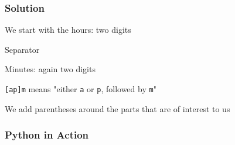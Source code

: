 \begin{frame}
  \frametitle{Solution}
  \begin{center} \ttfamily
  \end{center}
  \vskip5mm
  \begin{overprint}
    \begin{center}
      We start with the hours: two digits
    \end{center}

    \begin{center}
      Separator
    \end{center}

    \begin{center}
      Minutes: again two digits
    \end{center}

    \begin{center}
      \texttt{[ap]m} means "either \texttt{a} or \texttt{p}, followed by \texttt{m}"
    \end{center}

    \begin{center}
      We add parentheses around the parts that are of interest to us
    \end{center}
  \end{overprint}
\end{frame}

\begin{frame}
  \frametitle{Python in Action}
\end{frame}